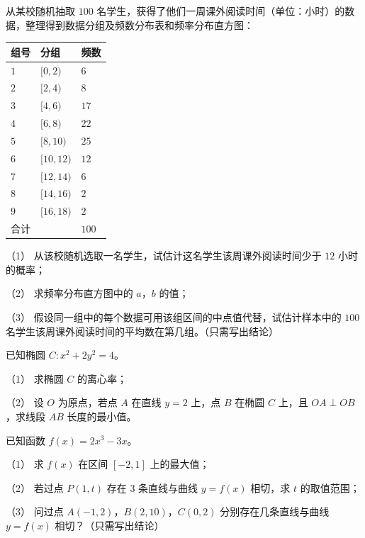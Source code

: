 \begin{question}
从某校随机抽取 $100$ 名学生，获得了他们一周课外阅读时间（单位：小时）的数据，整理得到数据分组及频数分布表和频率分布直方图：

\begin{center}
\begin{tabular}{lll}
\toprule
组号 & 分组 & 频数 \\
\midrule
$1$ & $[0,2)$ & $6$ \\
$2$ & $[2,4)$ & $8$ \\
$3$ & $[4,6)$ & $17$ \\
$4$ & $[6,8)$ & $22$ \\
$5$ & $[8,10)$ & $25$ \\
$6$ & $[10,12)$ & $12$ \\
$7$ & $[12,14)$ & $6$ \\
$8$ & $[14,16)$ & $2$ \\
$9$ & $[16,18)$ & $2$ \\
合计 &  & $100$ \\
\bottomrule
\end{tabular}
\end{center}
\nopagebreak[4]
\begin{center}\end{center}
\nopagebreak[4]
（1） 从该校随机选取一名学生，试估计这名学生该周课外阅读时间少于 $12$ 小时的概率；

（2） 求频率分布直方图中的 $a$，$b$ 的值；

（3） 假设同一组中的每个数据可用该组区间的中点值代替，试估计样本中的 $100$ 名学生该周课外阅读时间的平均数在第几组。（只需写出结论）

\end{question}
\begin{question}
已知椭圆 $C:x^2+2y^2=4$。

（1） 求椭圆 $C$ 的离心率；

（2） 设 $O$ 为原点，若点 $A$ 在直线 $y=2$ 上，点 $B$ 在椭圆 $C$ 上，且 $OA\perp OB$，求线段 $AB$ 长度的最小值。

\end{question}
\begin{question}
已知函数 $f(x)=2x^3-3x$。

（1） 求 $f(x)$ 在区间 $[-2,1]$ 上的最大值；

（2） 若过点 $P(1,t)$ 存在 $3$ 条直线与曲线 $y=f(x)$ 相切，求 $t$ 的取值范围；

（3） 问过点 $A(-1,2)$，$B(2,10)$，$C(0,2)$ 分别存在几条直线与曲线 $y=f(x)$ 相切？（只需写出结论）

\end{question}